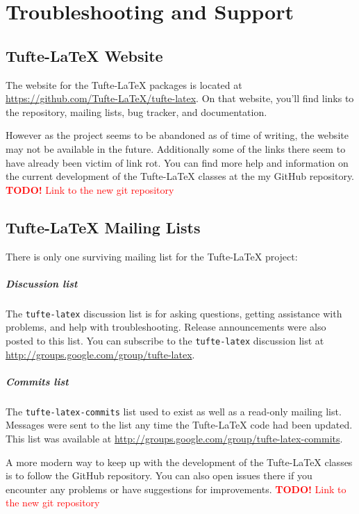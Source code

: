 \documentclass[a4paper]{tufte-book}
\newcommand{\TL}{Tufte-\LaTeX\xspace}
\newcommand{\TODO}[1]{\textcolor{red}{\textbf{TODO!} #1}\xspace}
\begin{document}
\chapter{Troubleshooting and Support}\label{ch:troubleshooting}
\section{\TL Website}\label{sec:website}
The website for the \TL packages is located at \url{https://github.com/Tufte-LaTeX/tufte-latex}.
On that website, you'll find links to the  repository, mailing lists, bug tracker, and documentation.

However as the project seems to be abandoned as of time of writing, the website may not be available in the future.
Additionally some of the links there seem to have already been victim of link rot.
You can find more help and information on the current development of the \TL classes at the my GitHub repository.
\TODO{Link to the new git repository}


\section{\TL Mailing Lists}\label{sec:mailing-lists}
There is only one surviving mailing list for the \TL project:

\paragraph{Discussion list}
The \texttt{tufte-latex} discussion list is for asking questions, getting assistance with problems, and help with troubleshooting. 
Release announcements were also posted to this list. 
You can subscribe to the \texttt{tufte-latex} discussion list at \url{http://groups.google.com/group/tufte-latex}.

\paragraph{Commits list}
The \texttt{tufte-latex-commits} list used to exist as well as a read-only mailing list. 
Messages were sent to the list any time the \TL code had been updated.
This list was available at \url{http://groups.google.com/group/tufte-latex-commits}.

A more modern way to keep up with the development of the \TL classes is to follow the GitHub repository.
You can also open issues there if you encounter any problems or have suggestions for improvements.
\TODO{Link to the new git repository}
\end{document}
